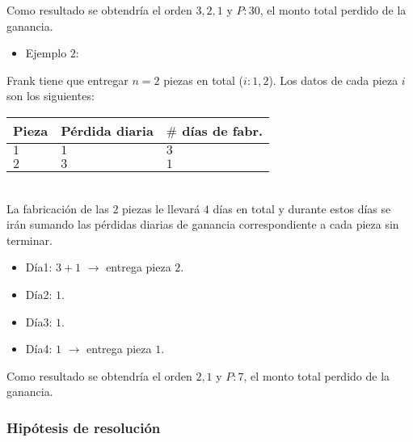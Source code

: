 \documentclass[11pt, a4paper, twoside]{article}
\begin{document}
Como resultado se obtendría el orden $3,2,1$ y $P:30$, el monto total perdido de la ganancia. \\

\begin{itemize}
	\item Ejemplo $2$: 
\end{itemize}

Frank tiene que entregar $n=2$ piezas en total ($i:1,2$). Los datos de cada pieza $i$ son los siguientes: \\

\begin{tabular}{|l|l|l|}
	\hline
	Pieza &  Pérdida diaria & $\#$ días de fabr.\\
	\hline
	$1$   &     $1$         & $3$               \\
	\hline 
	$2$   &     $3$         & $1$               \\
	\hline 
\end{tabular} \\ 
    
La fabricación de las $2$ piezas le llevará $4$ días en total y durante estos días se irán sumando las pérdidas diarias de ganancia correspondiente a cada pieza sin terminar. 

\begin{itemize}
	\item Día1: $3+1$ $\rightarrow$ entrega pieza $2$. 
	\item Día2: $1$. 
	\item Día3: $1$.
	\item Día4: $1$ $\rightarrow$ entrega pieza $1$.
\end{itemize}  	
	
Como resultado se obtendría el orden $2,1$ y $P:7$, el monto total perdido de la ganancia. 

\subsubsection{Hipótesis de resolución}
\end{document}
